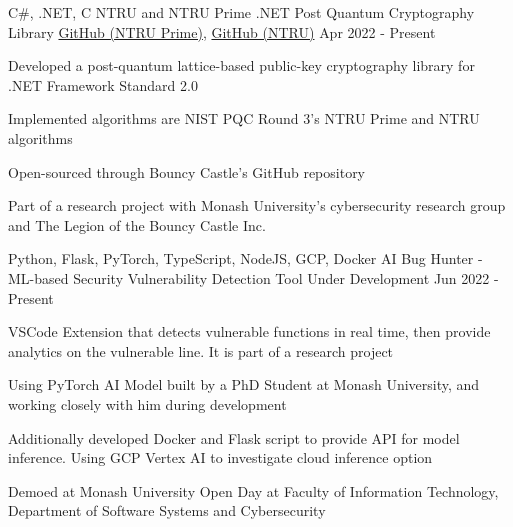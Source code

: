 




\begin{cventries}

  \cventry
  {C\#, .NET, C}
  {NTRU and NTRU Prime .NET Post Quantum Cryptography Library}
  {\href{https://github.com/bcgit/bc-csharp/tree/master/crypto/src/pqc/crypto/ntruprime}{GitHub (NTRU Prime)}, \href{https://github.com/bcgit/bc-csharp/tree/master/crypto/src/pqc/crypto/ntru}{GitHub (NTRU)}} %
  {Apr 2022 - Present}
  {
    \begin{cvitems}
      \item {Developed a post-quantum lattice-based public-key cryptography library for .NET Framework Standard 2.0}
      \item {Implemented algorithms are NIST PQC Round 3's NTRU Prime and NTRU algorithms}
      \item {Open-sourced through Bouncy Castle's GitHub repository}
      \item {Part of a research project with Monash University's cybersecurity research group and The Legion of the Bouncy Castle Inc.}
    \end{cvitems}
  }

  \cventry
  {Python, Flask, PyTorch, TypeScript, NodeJS, GCP, Docker}
  {AI Bug Hunter - ML-based Security Vulnerability Detection Tool}
  {Under Development} %
  {Jun 2022 - Present}
  {
    \begin{cvitems}
      \item {VSCode Extension that detects vulnerable functions in real time, then provide analytics on the vulnerable line. It is part of a research project}
      \item {Using PyTorch AI Model built by a PhD Student at Monash University, and working closely with him during development}
      \item {Additionally developed Docker and Flask script to provide API for model inference. Using GCP Vertex AI to investigate cloud inference option}
      \item {Demoed at Monash University Open Day at Faculty of Information Technology, Department of Software Systems and Cybersecurity}
    \end{cvitems}
  }


\end{cventries}
